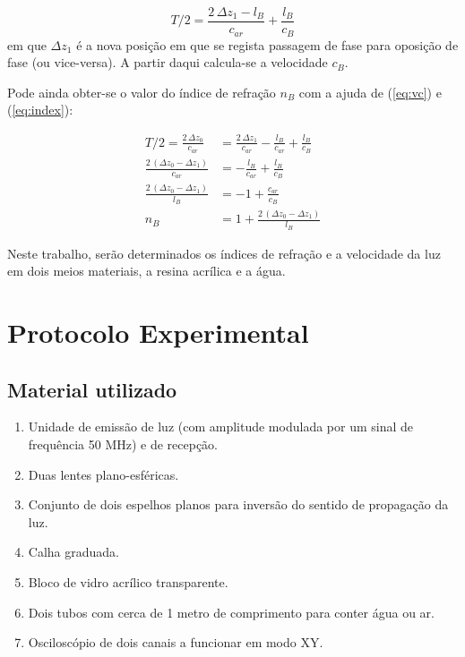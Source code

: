 \documentclass[a4paper,12pt]{article}      %
\begin{document}
\begin{equation}
	\label{eq:vc_bloco}
	{T/2}  = \frac{2\,\Delta z_1 - l_B}{c_{ar}}  +  \frac{l_B}{c_{B}}
\end{equation}
em que $\Delta z_1$ é a nova posição em que se regista passagem de fase para oposição de fase (ou vice-versa). A partir daqui calcula-se a velocidade $c_{B}$.  

Pode ainda obter-se o valor do índice de refração $n_{B}$ com a ajuda de (\ref{eq:vc}) e (\ref{eq:index}):

\begin{align}
	\label{eq:n_bloco}
	{T/2}  = \frac{2\,\Delta z_0}{c_{ar}}  &=  \frac{2\,\Delta z_1 }{c_{ar}} -   \frac{l_B}{c_{ar}}  +  \frac{l_B}{c_{B}} \nonumber \\ 
	\frac{2\,(\Delta z_0- \Delta z_1 )}{c_{ar}}  &= -   \frac{l_B}{c_{ar}}  +  \frac{l_B}{c_{B}} \nonumber \\
	\frac{2\,(\Delta z_0- \Delta z_1 )}{l_B} &= -1 +  \frac{c_{ar}}{c_{B}} \nonumber \\
	n_{B} &= 1 +  \frac{2\,(\Delta z_0- \Delta z_1 )}{l_B} 
\end{align}

Neste trabalho, serão  determinados os índices de refração e a velocidade da luz em  dois meios materiais, a resina acrílica e a água. 
 


\newpage
\section{\sf Protocolo Experimental}
\subsection{\sf Material utilizado}

\begin{enumerate}
\setlength{\itemsep}{0mm}
\item Unidade de emissão de luz  (com amplitude modulada por um sinal de frequência 50 MHz) e de recepção.
\item Duas lentes plano-esféricas.
\item Conjunto de dois espelhos planos para inversão do sentido de propagação da luz.
\item Calha graduada.  
\item Bloco de vidro acrílico transparente.
\item Dois tubos com cerca de 1 metro de comprimento para conter água ou ar. 
\item Osciloscópio de dois canais a funcionar em modo XY.
\end{enumerate}
\end{document}
